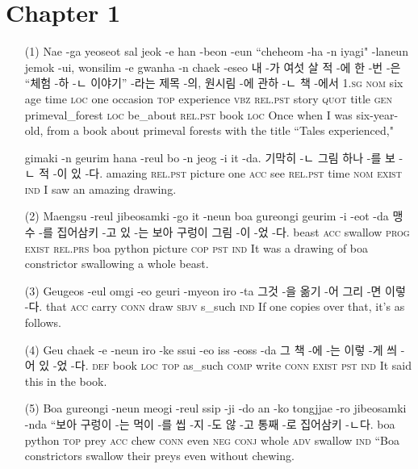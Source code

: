 \section*{Chapter 1}

\begin{itemize}
\item [(1)]
\tgl
		{Nae -ga yeoseot sal jeok -e han -beon -eun ``cheheom -ha -n iyagi" -laneun jemok -ui, wonsilim -e gwanha -n chaek -eseo}
		{내 -가 여섯 살 적 -에 한 -번 -은 ``체험 -하 -ㄴ 이야기” -라는 제목 -의, 원시림 -에 관하 -ㄴ 책 -에서}
		{\textsc{1.sg} \textsc{nom} six age time \textsc{loc} one occasion \textsc{top}	experience \textsc{vbz} \textsc{rel.pst} story \textsc{quot} title \textsc{gen} primeval\_forest \textsc{loc} be\_about \textsc{rel.pst} book \textsc{loc}}
		{Once when I was six-year-old, from a book about primeval forests with the title ``Tales experienced,"}
		
\tgl
		{gimaki -n geurim hana -reul bo -n jeog -i it -da.}
		{기막히 -ㄴ 그림 하나 -를 보 -ㄴ 적 -이 있 -다.}
		{amazing \textsc{rel.pst} picture one \textsc{acc} see \textsc{rel.pst} time \textsc{nom} \textsc{exist} \textsc{ind}}
		{I saw an amazing drawing.}

\item [(2)]
\tgl
		{Maengsu -reul jibeosamki -go it -neun boa gureongi geurim -i -eot -da}
		{맹수 -를 집어삼키 -고 있 -는 보아 구렁이 그림 -이 -었 -다.}
		{beast \textsc{acc} swallow \textsc{prog} \textsc{exist} \textsc{rel.prs} boa python picture \textsc{cop} \textsc{pst} \textsc{ind}}
		{It was a drawing of boa constrictor swallowing a whole beast.}

\item [(3)]
\tgl
		{Geugeos -eul omgi -eo geuri -myeon iro -ta}
		{그것 -을 옮기 -어 그리 -면 이렇 -다.}
		{that \textsc{acc} carry \textsc{conn} draw \textsc{sbjv} s\_such \textsc{ind}}
		{If one copies over that, it's as follows.}

\item [(4)]
\tgl
		{Geu chaek -e -neun iro -ke ssui -eo iss -eoss -da}
		{그 책 -에 -는 이렇 -게 씌 -어 있 -었 -다.}
		{\textsc{def} book \textsc{loc} \textsc{top} as\_such \textsc{comp} write \textsc{conn} \textsc{exist} \textsc{pst} \textsc{ind}}
		{It said this in the book.}

\item [(5)]
\tgl
		{Boa gureongi -neun meogi -reul ssip -ji -do an -ko tongjjae -ro jibeosamki -nda}
		{``보아 구렁이 -는 먹이 -를 씹 -지 -도 않 -고 통째 -로 집어삼키 -ㄴ다.}
		{boa python \textsc{top} prey \textsc{acc} chew \textsc{conn} even \textsc{neg} \textsc{conj} whole \textsc{adv} swallow \textsc{ind}}
		{``Boa constrictors swallow their preys even without chewing.}


\end{itemize}
